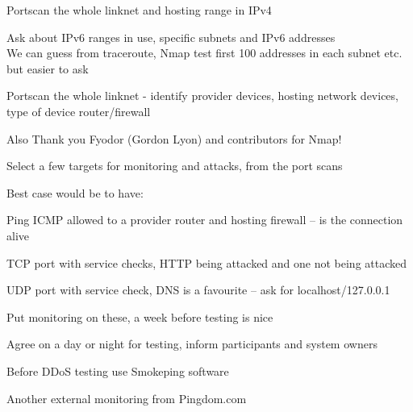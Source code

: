 \documentclass[Screen16to9,17pt]{foils}
\begin{document}



\begin{list2}
\item Portscan the whole linknet and hosting range in IPv4
\item Ask about IPv6 ranges in use, specific subnets and IPv6 addresses\\
We can guess from traceroute, Nmap test first 100 addresses in each subnet etc. but easier to ask
\item Portscan the whole linknet - identify provider devices, hosting network devices, type of device router/firewall
\item Also Thank you Fyodor (Gordon Lyon) and contributors for Nmap!
\end{list2}



Select a few targets for monitoring and attacks, from the port scans

Best case would be to have:
\begin{list2}
\item Ping ICMP allowed to a provider router and hosting firewall -- is the connection alive
\item TCP port with service checks, HTTP being attacked and one not being attacked
\item UDP port with service check, DNS is a favourite -- ask for localhost/127.0.0.1
\item Put monitoring on these, a week before testing is nice
\item Agree on a day or night for testing, inform participants and system owners
\end{list2}



\centerline{Before DDoS testing  use Smokeping software}



\centerline{Another external monitoring from Pingdom.com}


\end{document}

